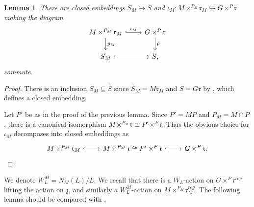 \documentclass{amsart}
\newtheorem{lemma}[theorem]{Lemma}
\theoremstyle{remark}
\numberwithin{theorem}{section}
\numberwithin{equation}{section}
\begin{document}
\begin{lemma}\label{GSLevilem}
     There are closed embeddings $\overline{S}_M \hookrightarrow\overline{S}$ and $\iota_M:M \times^{P_M} \mathfrak{r}_M \hookrightarrow G \times^P \mathfrak{r}$ making the diagram
    \begin{equation}\label{GSLevi1eqn}
\begin{tikzcd}
 M \times^{P_M} \mathfrak{r}_M \arrow[r, "\iota_M", hook] \arrow[d, "\hat{p}_M"] & G \times^P \mathfrak{r} \arrow[d, "\hat{p}"] \\
\overline{S}_M \arrow[r, hook]                                                                                 & \overline{S},                                  
\end{tikzcd}
    \end{equation}
    commute.
\end{lemma}

\begin{proof} 
There is an inclusion $\overline{S}_M \subseteq \overline{S}$ since $\overline{S}_M = M\mathfrak{r}_M$ and $\overline{S} = G\mathfrak{r}$ by \cite[Theorem 5.4]{BK}, which defines a closed embedding. 

Let $P'$ be as in the proof of the previous lemma. Since $P' = MP$ and $P_M = M \cap P$, there is a canonical isomorphism $M \times^{P_M} \mathfrak{r} \cong P' \times^P \mathfrak{r}$. Thus the obvious choice for $\iota_M$ decomposes into closed embeddings as
\begin{equation}\label{GSLevi2eqn}
\begin{tikzcd}
M \times^{P_M} \mathfrak{r}_M \arrow[r, hook] & M \times^{P_M} \mathfrak{r} \cong P' \times^P \mathfrak{r} \arrow[r, hook] & G \times^P \mathfrak{r}.
\end{tikzcd}
\end{equation} 
\end{proof}

We denote $W_L^M=N_M(L)/L$. We recall that there is a $W_L$-action on $G \times^P\mathfrak{r}^{reg}$ lifting the action on $\mathfrak{z}$, and similarly a $W_L^M$-action on $M \times^{P_M} \mathfrak{r}_M^{reg}$. The following lemma should be compared with \cite[Proposition 10.6]{DG}.
\end{document}
